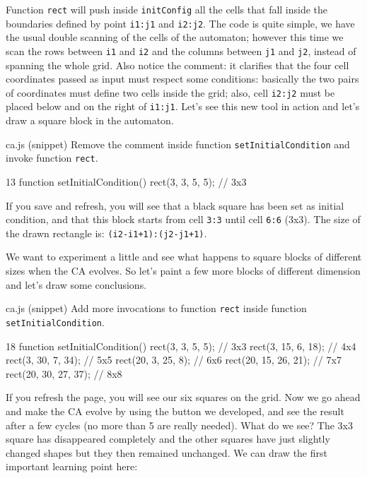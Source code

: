 Function \texttt{rect} will push inside \texttt{initConfig} all the cells that fall inside the
boundaries defined by point \texttt{i1:j1} and \texttt{i2:j2}. The code is quite simple, we have
the usual double scanning of the cells of the automaton; however this time we scan the rows between
\texttt{i1} and \texttt{i2} and the columns between \texttt{j1} and \texttt{j2}, instead of
spanning the whole grid. Also notice the comment: it clarifies that the four cell coordinates
passed as input must respect some conditions: basically the two pairs of coordinates must define
two cells inside the grid; also, cell \texttt{i2:j2} must be placed below and on the right
of \texttt{i1:j1}.
Let's see this new tool in action and let's draw a square block in the automaton.

\begin{programcode}{ca.js (snippet)}
Remove the comment inside function \texttt{setInitialCondition} and
invoke function \texttt{rect}.
\begin{codeh1}{1}{3}
function setInitialCondition() {
  rect(3, 3, 5, 5); // 3x3
}
\end{codeh1}
\end{programcode}

If you save and refresh, you will see that a black square has been set as initial condition,
and that this block starts from cell \texttt{3:3} until cell \texttt{6:6} (3x3).
The size of the drawn rectangle is: \texttt{(i2-i1+1):(j2-j1+1)}.

We want to experiment a little and see what happens to square blocks of different sizes when
the CA evolves. So let's paint a few more blocks of different dimension and let's draw some
conclusions.

\begin{programcode}{ca.js (snippet)}
Add more invocations to function \texttt{rect} inside function \texttt{setInitialCondition}.
\begin{codeh1}{1}{8}
function setInitialCondition() {
  rect(3, 3, 5, 5); // 3x3
  rect(3, 15, 6, 18); // 4x4
  rect(3, 30, 7, 34); // 5x5
  rect(20, 3, 25, 8); // 6x6
  rect(20, 15, 26, 21); // 7x7
  rect(20, 30, 27, 37); // 8x8
}
\end{codeh1}
\end{programcode}

If you refresh the page, you will see our six squares on the grid. Now we go ahead and make the
CA evolve by using the button we developed, and see the result after a few cycles (no more than 5
are really needed). What do we see? The 3x3 square has disappeared completely and the other
squares have just slightly changed shapes but they then remained unchanged.
We can draw the first important learning point here:


